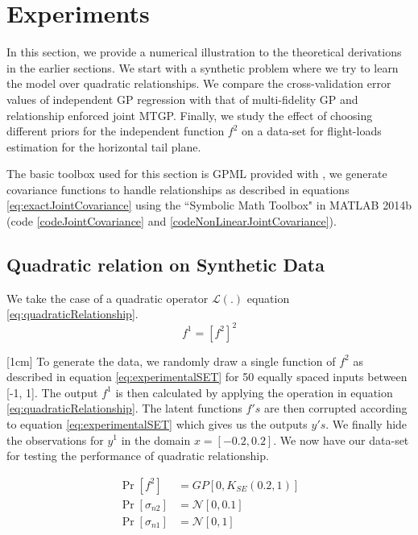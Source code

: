 \section{Experiments}\label{sec:results}
In this section, we provide a numerical illustration to the theoretical derivations in the earlier sections. We start with a synthetic problem where we try to learn the model over quadratic relationships. We compare the cross-validation error values of independent GP regression with that of multi-fidelity GP and relationship enforced joint MTGP. Finally, we study the effect of choosing different priors for the independent function $f^2$ on a data-set for flight-loads estimation for the horizontal tail plane.

The basic toolbox used for this section is GPML provided with \cite{Rasmussen2005}, we generate covariance functions to handle relationships as described in equations \ref{eq:exactJointCovariance} using the ``Symbolic Math Toolbox" in MATLAB 2014b (code \ref{codeJointCovariance} and \ref{codeNonLinearJointCovariance}). 

\subsection{Quadratic relation on Synthetic Data}\label{sub:experimentsSyntheticData}
We take the case of a quadratic operator \(\mathcal{L}(.)\) equation \ref{eq:quadraticRelationship}. 
\begin{equation}\label{eq:quadraticRelationship}
f^{1} = \left [f^{2} \right]^2
\end{equation}

[1cm]
To generate the data, we randomly draw a single function of \(f^{2}\) as described in equation \ref{eq:experimentalSET} for 50 equally spaced inputs between [-1, 1]. The output \(f^{1}\) is then calculated by applying the operation in equation \ref{eq:quadraticRelationship}. The latent functions \(f's\) are then corrupted according to equation \ref{eq:experimentalSET} which gives us the outputs \(y's\). We finally hide the observations for \(y^{1}\) in the domain \(x = [-0.2, 0.2]\). We now have our data-set for testing the performance of quadratic relationship. 

\begin{equation}\label{eq:experimentalSET}
\begin{aligned}
\Pr[f^{2}] & =   GP[0, K_{SE}(0.2, 1)] \\
\Pr[\sigma_{n2}] & = \mathcal{N}[0, 0.1] \\
\Pr[\sigma_{n1}] & = \mathcal{N}[0, 1]
\end{aligned}
\end{equation}
     
